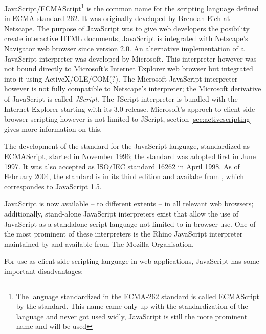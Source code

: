 JavaScript/ECMAScript\footnote{The language standardized in the ECMA-262 standard is called ECMAScript by the standard. This name came only up with the standardization of the language and never got used widly, JavaScript is still the more prominent name and will be used} is the common name for the scripting language defined in ECMA standard 262. It was originally developed
by Brendan Eich at Netscape. The purpose of JavaScript was to give web developers the posibility create interactive HTML documents; JavaScript is integrated with Netscape's Navigator web browser since version 2.0. An alternative implementation of a JavaScript interpreter was developed by Microsoft. This interpreter however was not bound directly to Microsoft's Internet Explorer web browser but integrated into it using ActiveX/OLE/COM(?). The Microsoft JavaScript interpreter however is not fully compatible to Netscape's interpreter; the Microsoft derivative of JavaScript is called \emph{JScript}. The JScript interpreter is bundled with the Internet Explorer starting with its 3.0 release. Microsoft's approch to client side browser scripting however is not limited to JScript, section \ref{sec:activescripting} gives more information on this.

The development of the standard for the JavaScript language, standardized as ECMAScript, started in November 1996; the standard was adopted first in June 1997. It was also accepted as ISO/IEC standard 16262 in April 1998. As of February 2004, the standard is in its third edition and availabe from \cite{ECMA-262}, which correspondes to JavaScript 1.5.


JavaScript is now available -- to different extents -- in all relevant web browsers; additionally, stand-alone JavaScript interpreters exist that allow the use of JavaScript as a standalone script language not limited to in-browser use. One of the most prominent of these interpreters is the Rhino JavaScript interpreter maintained by and available from The Mozilla Organisation.


For use as client side scripting language in web applications, JavaScript has some important disadvantages:

